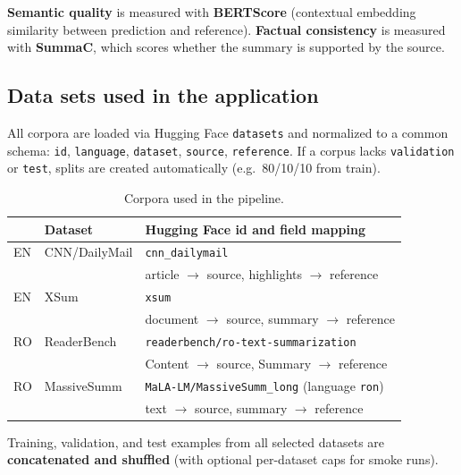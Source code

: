 \documentclass[11pt,a4paper]{article}
\begin{document}
\textbf{Semantic quality} is measured with \textbf{BERTScore} (contextual embedding similarity between prediction and reference).
\textbf{Factual consistency} is measured with \textbf{SummaC}, which scores whether the summary is supported by the source.

\subsection{Data sets used in the application}

All corpora are loaded via Hugging Face \texttt{datasets} and normalized to a common schema:
\texttt{id}, \texttt{language}, \texttt{dataset}, \texttt{source}, \texttt{reference}.
If a corpus lacks \texttt{validation} or \texttt{test}, splits are created automatically (e.g.\ 80/10/10 from train).

\begin{table}[htbp]
  \centering
  \small
  \caption{Corpora used in the pipeline.}
  \label{tab:datasets}
  \setlength{\tabcolsep}{5pt}
  \renewcommand{\arraystretch}{1.15}
  \begin{tabularx}{\linewidth}{@{}>{\raggedright\arraybackslash}p{0.5cm} >{\raggedright\arraybackslash}p{2.1cm} X@{}}
    \toprule
    & Dataset & Hugging Face id and field mapping \\
    \midrule
    EN & CNN/DailyMail &
      \nolinkurl{cnn_dailymail} \\
    & & article $\rightarrow$ source, highlights $\rightarrow$ reference \\
    \addlinespace
    EN & XSum &
      \nolinkurl{xsum} \\
    & & document $\rightarrow$ source, summary $\rightarrow$ reference \\
    \addlinespace
    RO & ReaderBench &
      \nolinkurl{readerbench/ro-text-summarization} \\
    & & Content $\rightarrow$ source, Summary $\rightarrow$ reference \\
    \addlinespace
    RO & MassiveSumm &
      \nolinkurl{MaLA-LM/MassiveSumm_long} (language \texttt{ron}) \\
    & & text $\rightarrow$ source, summary $\rightarrow$ reference \\
    \bottomrule
  \end{tabularx}
\end{table}

Training, validation, and test examples from all selected datasets are \textbf{concatenated and shuffled} (with optional per-dataset caps for smoke runs).
\end{document}
